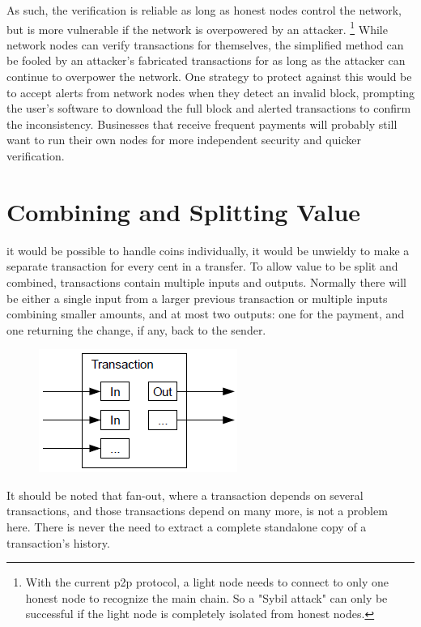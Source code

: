 \documentclass[nohyper]{tufte-handout}
\begin{document}
As such, the verification is reliable as long as honest nodes control
the network, but is more vulnerable if the network is overpowered by an
attacker.  \footnote{With the current p2p protocol, a light node needs to connect to only one honest node to recognize the main chain.  So a "Sybil attack" can only be successful if the light node is completely isolated from honest nodes.} While network nodes can verify transactions for themselves,
the simplified method can be fooled by an attacker's fabricated
transactions for as long as the attacker can continue to overpower the
network. One strategy to protect against this would be to accept alerts
from network nodes when they detect an invalid block, prompting the
user's software to download the full block and alerted transactions to
confirm the inconsistency. Businesses that receive frequent payments
will probably still want to run their own nodes for more independent
security and quicker verification.

\section{Combining and Splitting
Value}\label{combining-and-splitting-value}

 it would be possible to handle coins individually, it would be
unwieldy to make a separate transaction for every cent in a transfer. To
allow value to be split and combined, transactions contain multiple
inputs and outputs. Normally there will be either a single input from a
larger previous transaction or multiple inputs combining smaller
amounts, and at most two outputs: one for the payment, and one returning
the change, if any, back to the sender.

\begin{figure}[!h]
\centering
\includegraphics[width=0.3725\linewidth]{combining-splitting.png}

\end{figure}

It should be noted that fan-out, where a transaction depends on several
transactions, and those transactions depend on many more, is not a
problem here. There is never the need to extract a complete standalone
copy of a transaction's history.
\end{document}
